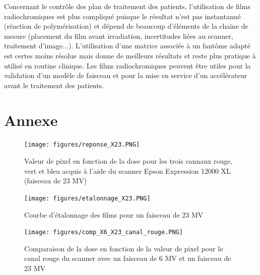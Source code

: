 \documentclass{book}
\begin{document}
Concernant le contrôle des plan de traitement des patients, l'utilisation de films radiochromiques est plus compliqué puisque le résultat n'est pas instantanné (réaction de polymérisation) et dépend de beaucoup d'éléments de la chaine de mesure (placement du film avant irradiation, incertitudes liées au scanner, traitement d'image...). L'utilisation d'une matrice associée à un fantôme adapté est certes moins résolue mais donne de meilleurs résultats et reste plus pratique à utilisé en routine clinique. Les films radiochromiques peuvent être utiles pour la validation d'un modèle de faisceau et pour la mise en service d'un accélérateur avant le traitement des patients.

\chapter{Annexe}

\begin{figure}[h]
  \centering
  \texttt{[image: figures/reponse\_X23.PNG]}
  \caption{Valeur de pixel en fonction de la dose pour les trois cannaux rouge, vert et bleu acquis à l'aide du scanner Epson Expression 12000 XL (faisceau de 23 MV)}
  \label{fig_reponse_scanner_X23}
\end{figure}

\begin{figure}[h]
  \centering
  \texttt{[image: figures/etalonnage\_X23.PNG]}
  \caption{Courbe d'étalonnage des films pour un faisceau de 23 MV}
  \label{fig_courbe_etalonnage_X23}
\end{figure}

\begin{figure}[h]
  \centering
  \texttt{[image: figures/comp\_X6\_X23\_canal\_rouge.PNG]}
  \caption{Comparaison de la dose en fonction de la valeur de pixel pour le canal rouge du scanner avec un faisceau de 6 MV et un faisceau de 23 MV}
  \label{fig_comp_canal_rouge}
\end{figure}
\end{document}

